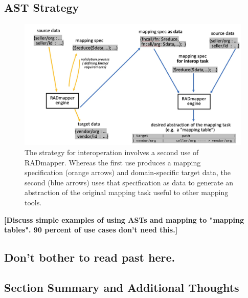 \documentclass[9pt,letterpaper]{article}
\begin{document}
\subsection{AST Strategy}

\begin{figure}[H]
  \caption{The strategy for interoperation involves a second use of RADmapper. Whereas the first use produces a mapping specification (orange arrows) and domain-specific target data, the second (blue arrows) uses that specification as data to generate an abstraction of the original mapping task useful to other mapping tools.}
  \label{fig:ast-strategy}
   \includegraphics[scale=0.28]{ast-strategy.jpg}  
\end{figure}



\textbf{[Discuss simple examples of using ASTs and mapping to "mapping tables". 90 percent of use cases don't need this.]}

\subsection{Don't bother to read past here.}

\subsection{Section Summary and Additional Thoughts}
\end{document}
